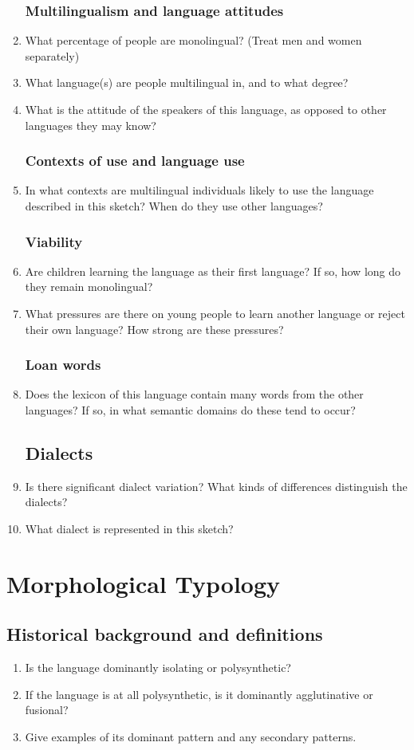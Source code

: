 \documentclass[]{scrartcl}
\begin{document}
\begin{enumerate}
\subsubsection{Multilingualism and language attitudes}
\item What percentage of people are monolingual? (Treat men and women separately)
\item What language(s) are people multilingual in, and to what degree?
\item What is the attitude of the speakers of this language, as opposed to other languages they may know?
\subsubsection{Contexts of use and language use}
\item In what contexts are multilingual individuals likely to use the language described in this sketch?  When do they use other languages?
\subsubsection{Viability}
\item Are children learning the language as their first language?  If so, how long do they remain monolingual?
\item What pressures are there on young people to learn another language or reject their own language?  How strong are these pressures?
\subsubsection{Loan words}
\item Does the lexicon of this language contain many words from the other languages? If so, in what semantic domains do these tend to occur?
\subsection{Dialects}
\item Is there significant dialect variation? What kinds of differences distinguish the dialects?
\item What dialect is represented in this sketch?
\end{enumerate}
\section{Morphological Typology}
\subsection{Historical background and definitions}
\begin{enumerate}[resume]
\item Is the language dominantly isolating or polysynthetic?
\item If the language is at all polysynthetic, is it dominantly agglutinative or fusional?
\item Give examples of its dominant pattern and any secondary patterns.
\end{enumerate}
\end{document}
